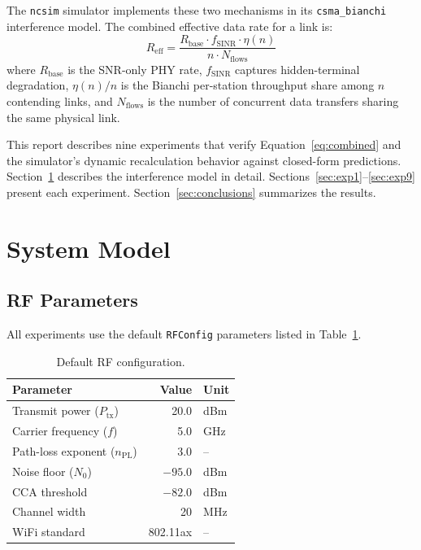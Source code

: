 \documentclass[11pt,a4paper]{article}
\newcommand{\ncsim}{\texttt{ncsim}}
\begin{document}
The \ncsim{} simulator implements these two mechanisms in its \texttt{csma\_bianchi} interference model. The combined effective data rate for a link is:
\begin{equation}
    R_{\text{eff}} = \frac{R_{\text{base}} \cdot f_{\text{SINR}} \cdot \eta(n)}{n \cdot N_{\text{flows}}}
    \label{eq:combined}
\end{equation}
where $R_{\text{base}}$ is the SNR-only PHY rate, $f_{\text{SINR}}$ captures hidden-terminal degradation, $\eta(n)/n$ is the Bianchi per-station throughput share among $n$ contending links, and $N_{\text{flows}}$ is the number of concurrent data transfers sharing the same physical link.

This report describes nine experiments that verify Equation~\eqref{eq:combined} and the simulator's dynamic recalculation behavior against closed-form predictions. Section~\ref{sec:model} describes the interference model in detail. Sections~\ref{sec:exp1}--\ref{sec:exp9} present each experiment. Section~\ref{sec:conclusions} summarizes the results.

\section{System Model}
\label{sec:model}

\subsection{RF Parameters}

All experiments use the default \texttt{RFConfig} parameters listed in Table~\ref{tab:rf}.

\begin{table}[h]
\centering
\caption{Default RF configuration.}
\label{tab:rf}
\begin{tabular}{lrl}
\toprule
Parameter & Value & Unit \\
\midrule
Transmit power ($P_{\text{tx}}$) & 20.0 & dBm \\
Carrier frequency ($f$) & 5.0 & GHz \\
Path-loss exponent ($n_{\text{PL}}$) & 3.0 & -- \\
Noise floor ($N_0$) & $-95.0$ & dBm \\
CCA threshold & $-82.0$ & dBm \\
Channel width & 20 & MHz \\
WiFi standard & 802.11ax & -- \\
\bottomrule
\end{tabular}
\end{table}
\end{document}
